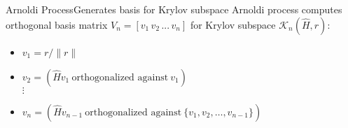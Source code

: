 \documentclass{beamer}
\newcommand{\R}{\mathbb{R}}
\newcommand{\A}{\widehat{H}}
\newcommand{\krylov}[3]{\mathcal{K}_{#1}\left({#2},{#3} \right)}
\theoremstyle{remark}
\begin{document}
\begin{comment}

\begin{frame}{Power iterations converge to invariant subspace}
 Example: For $v\in\R^N$ expressed in terms of eigenpairs $(\lambda_j, z_j)$
 of $\A$, successive left multiplication by $\A$ yields:
	\begin{align*}
		   \A^k v &= \sum_{j=1}^N \alpha_j \A^k z_j\\
		   &= \alpha_1 \mathlarger{\alert{\lambda_1^k}} z_1 + \mathsmaller{\alpha_2 \lambda_2^k z_2 + \cdots + \alpha_N \lambda_N^k z_N}
   	\end{align*}
   	
   	

   	\begin{itemize}
    	\item Assmuming $\lambda_1 > \lambda_j$ for $j>1$, \\ $v_n\rightarrow z_1$. 
    	Naive process (power iterations) gets `stuck'.  
    \end{itemize}
\end{frame}


\end{comment}



\begin{frame}{Arnoldi Process}{Generates basis for Krylov subspace}
Arnoldi process computes orthogonal basis matrix 
$V_n = \left[ v_1\, v_2\, ...\, v_n \right]$ for Krylov subspace $\krylov{n}{\A}{r}$:
  
  \medskip
  \begin{itemize}
	   \item $v_1 = r/\|r\|$
	   \item $v_2 = \left(\A v_1\ \text{orthogonalized against}\  v_1\right)$
	   \\ $\vdots$ 
	   \item $v_n = \left(\A v_{n-1}\  \text{orthogonalized against}\  
		      \{v_1,v_2,\ldots ,v_{n-1}\}\right)$
   \end{itemize}
\end{frame}
\end{document}
